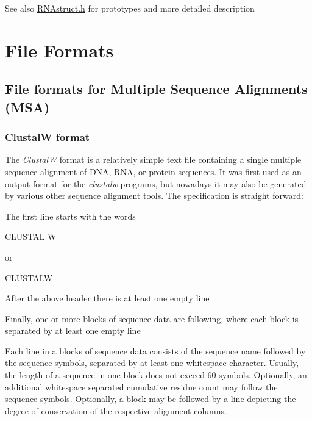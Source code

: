 \begin{DoxySeeAlso}{See also}
\mbox{\hyperlink{RNAstruct_8h}{R\+N\+Astruct.\+h}} for prototypes and more detailed description 
\end{DoxySeeAlso}
\hypertarget{file_formats}{}\section{File Formats}\label{file_formats}
\hypertarget{file_formats_msa-formats}{}\subsection{File formats for Multiple Sequence Alignments (\+M\+S\+A)}\label{file_formats_msa-formats}
\hypertarget{file_formats_msa-formats-clustal}{}\subsubsection{Clustal\+W format}\label{file_formats_msa-formats-clustal}
The {\itshape ClustalW} format is a relatively simple text file containing a single multiple sequence alignment of D\+NA, R\+NA, or protein sequences. It was first used as an output format for the {\itshape clustalw} programs, but nowadays it may also be generated by various other sequence alignment tools. The specification is straight forward\+:


\begin{DoxyItemize}
\item The first line starts with the words\begin{DoxyVerb}CLUSTAL W \end{DoxyVerb}
 or \begin{DoxyVerb}CLUSTALW \end{DoxyVerb}

\item After the above header there is at least one empty line
\item Finally, one or more blocks of sequence data are following, where each block is separated by at least one empty line
\end{DoxyItemize}Each line in a blocks of sequence data consists of the sequence name followed by the sequence symbols, separated by at least one whitespace character. Usually, the length of a sequence in one block does not exceed 60 symbols. Optionally, an additional whitespace separated cumulative residue count may follow the sequence symbols. Optionally, a block may be followed by a line depicting the degree of conservation of the respective alignment columns.

